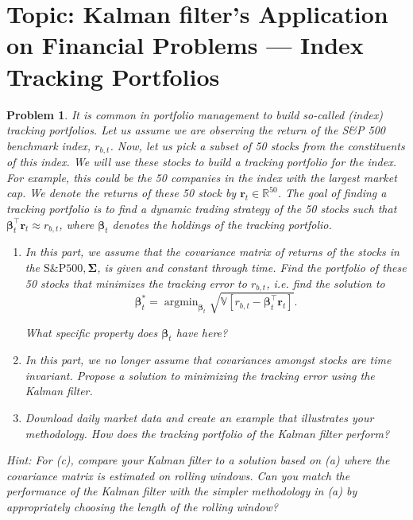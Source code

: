\documentclass[11pt]{article}
\theoremstyle{plain} %
\newtheorem{problem}[theorem]{Problem}
\theoremstyle{remark}
\begin{document}
\section{Topic: Kalman filter's Application on Financial Problems --- Index Tracking Portfolios}

\begin{problem}
It is common in portfolio management to build so-called (index) tracking
portfolios. Let us assume we are observing the return of the S\&P 500 benchmark
index, $r_{b, t}$. Now, let us pick a subset of 50 stocks from the constituents
of this index. We will use these stocks to build a tracking portfolio for the
index. For example, this could be the 50 companies in the index with the largest
market cap. We denote the returns of these 50 stock by $\mathbf{r}_t \in
  \mathbb{R}^{50}$. The goal of finding a tracking portfolio is to find a dynamic
trading strategy of the 50 stocks such that $\boldsymbol{\beta}_t^\top
  \mathbf{r}_t \approx r_{b, t}$, where $\boldsymbol{\beta}_t$ denotes the
holdings of the tracking portfolio.
\begin{enumerate}[label=(\alph*)]
  \item In this part, we assume that the covariance matrix of returns of the
        stocks in the $\mathrm{S} \& \mathrm{P} 500, \boldsymbol{\Sigma}$, is given
        and constant through time. Find the portfolio of these 50 stocks that
        minimizes the tracking error to $r_{b, t}$, i.e. find the solution to
        $$
          \boldsymbol{\beta}_t^*=\operatorname{argmin}_{\boldsymbol{\beta}_t} \sqrt{\mathbb{V}\left[r_{b, t}-\boldsymbol{\beta}_t^\top \mathbf{r}_t\right]} .
        $$

        What specific property does $\boldsymbol{\beta}_t$ have here?
  \item In this part, we no longer assume that covariances amongst stocks are
        time invariant. Propose a solution to minimizing the tracking error using the
        Kalman filter.
  \item Download daily market data and create an example that illustrates your
        methodology. How does the tracking portfolio of the Kalman filter perform?
\end{enumerate}
Hint: For (c), compare your Kalman filter to a solution based on (a) where the
covariance matrix is estimated on rolling windows. Can you match the performance
of the Kalman filter with the simpler methodology in (a) by appropriately
choosing the length of the rolling window?
\end{problem}
\end{document}
